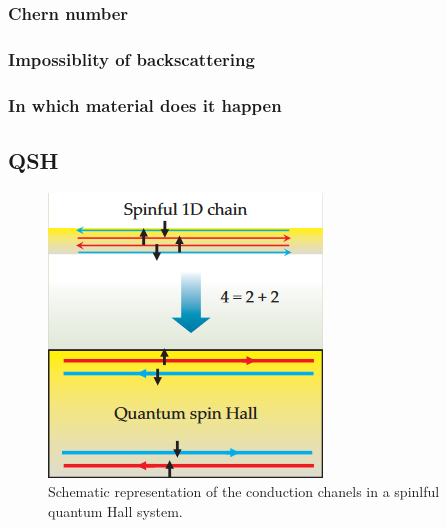 \subsubsection{Chern number}




\subsubsection{Impossiblity of backscattering}

\subsubsection{In which material does it happen}


\subsection{QSH}

\begin{figure}[h!]
    \includegraphics[scale = 0.7]{sections/visuel/spinful.png}
    \caption{Schematic representation of the conduction chanels in a spinlful quantum Hall system.}
    \label{spinful}
\end{figure}

